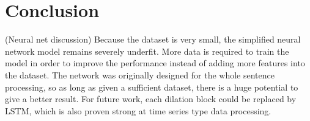 \section{Conclusion}
(Neural net discussion) Because the dataset is very small, the simplified neural network model remains severely underfit. More data is required to train the model in order to improve the performance instead of adding more features into the dataset. The network was originally designed for the whole sentence processing, so as long as given a sufficient dataset, there is a huge potential to give a better result. For future work, each dilation block could be replaced by LSTM, which is also proven strong at time series type data processing. 